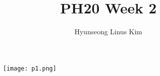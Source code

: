 \documentclass{article}
\title{PH20 Week 2}
\author{Hyunseong Linus Kim}
\begin{document}
	
	


	
\begin{figure}[H]
	
	\texttt{[image: p1.png]}
	
	
	
\end{figure} 
\end{document}
